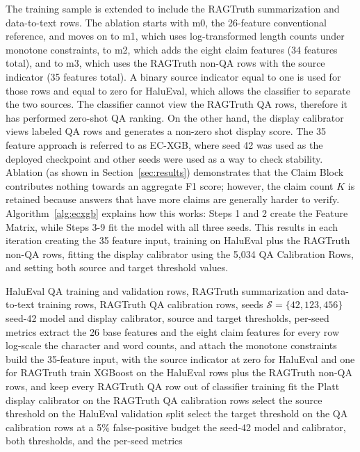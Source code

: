 \documentclass[a4paper,fleqn]{cas-sc}
\begin{document}
The training sample is extended to include the RAGTruth summarization and data-to-text rows. The ablation starts with m0, the 26-feature conventional reference, and moves on to m1, which uses log-transformed length counts under monotone constraints, to m2, which adds the eight claim features (34 features total), and to m3, which uses the RAGTruth non-QA rows with the source indicator (35 features total). A binary source indicator equal to one is used for those rows and equal to zero for HaluEval, which allows the classifier to separate the two sources. The classifier cannot view the RAGTruth QA rows, therefore it has performed zero-shot QA ranking. On the other hand, the display calibrator views labeled QA rows and generates a non-zero shot display score. The 35 feature approach is referred to as EC-XGB, where seed 42 was used as the deployed checkpoint and other seeds were used as a way to check stability. Ablation (as shown in Section~\ref{sec:results}) demonstrates that the Claim Block contributes nothing towards an aggregate F1 score; however, the claim count $K$ is retained because answers that have more claims are generally harder to verify. Algorithm~\ref{alg:ecxgb} explains how this works: Steps 1 and 2 create the Feature Matrix, while Steps 3-9 fit the model with all three seeds. This results in each iteration creating the 35 feature input, training on HaluEval plus the RAGTruth non-QA rows, fitting the display calibrator using the 5{,}034 QA Calibration Rows, and setting both source and target threshold values.


\begin{algorithm}[H]
  \caption{Evidence-consistent XGBoost (EC-XGB) training and deployment}
  \label{alg:ecxgb}
  \begin{algorithmic}[1]
    \Require HaluEval QA training and validation rows, RAGTruth summarization and data-to-text training rows, RAGTruth QA calibration rows, seeds $\mathcal{S}=\{42,123,456\}$
    \Ensure seed-42 model and display calibrator, source and target thresholds, per-seed metrics
    \State extract the 26 base features and the eight claim features for every row
    \State log-scale the character and word counts, and attach the monotone constraints
    \State build the 35-feature input, with the source indicator at zero for HaluEval and one for RAGTruth
    \State train XGBoost on the HaluEval rows plus the RAGTruth non-QA rows, and keep every RAGTruth QA row out of classifier training
    \State fit the Platt display calibrator on the RAGTruth QA calibration rows
    \State select the source threshold on the HaluEval validation split
    \State select the target threshold on the QA calibration rows at a 5\% false-positive budget
    \EndFor
    \State \Return the seed-42 model and calibrator, both thresholds, and the per-seed metrics
  \end{algorithmic}
\end{algorithm}
\end{document}
